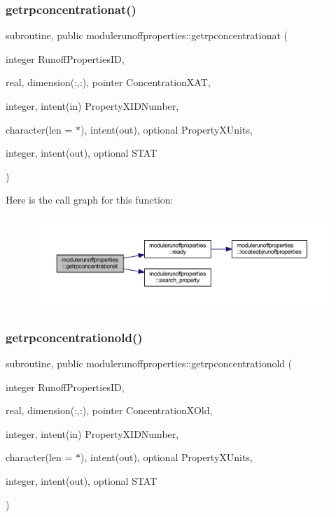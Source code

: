 \subsubsection{\texorpdfstring{getrpconcentrationat()}{getrpconcentrationat()}}
{\footnotesize\ttfamily subroutine, public modulerunoffproperties\+::getrpconcentrationat (\begin{DoxyParamCaption}\item[{integer}]{Runoff\+Properties\+ID,  }\item[{real, dimension(\+:,\+:), pointer}]{Concentration\+X\+AT,  }\item[{integer, intent(in)}]{Property\+X\+I\+D\+Number,  }\item[{character(len = $\ast$), intent(out), optional}]{Property\+X\+Units,  }\item[{integer, intent(out), optional}]{S\+T\+AT }\end{DoxyParamCaption})}

Here is the call graph for this function\+:\nopagebreak
\begin{figure}[H]
\begin{center}
\leavevmode
\includegraphics[width=350pt]{namespacemodulerunoffproperties_adc6e3ba349efad4b60c9287d22e284e9_cgraph}
\end{center}
\end{figure}
\mbox{\label{namespacemodulerunoffproperties_a2a7cc1e8991c2e54574415d7f00a5874}} 
\subsubsection{\texorpdfstring{getrpconcentrationold()}{getrpconcentrationold()}}
{\footnotesize\ttfamily subroutine, public modulerunoffproperties\+::getrpconcentrationold (\begin{DoxyParamCaption}\item[{integer}]{Runoff\+Properties\+ID,  }\item[{real, dimension(\+:,\+:), pointer}]{Concentration\+X\+Old,  }\item[{integer, intent(in)}]{Property\+X\+I\+D\+Number,  }\item[{character(len = $\ast$), intent(out), optional}]{Property\+X\+Units,  }\item[{integer, intent(out), optional}]{S\+T\+AT }\end{DoxyParamCaption})}

